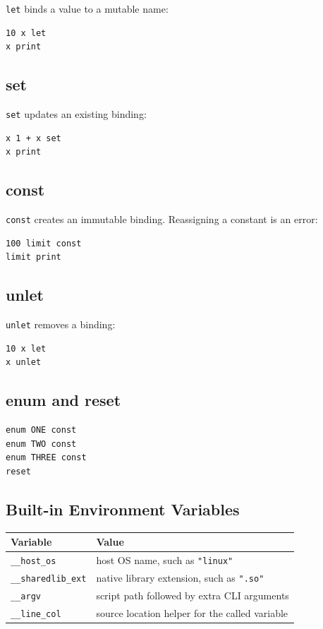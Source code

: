 \documentclass[11pt,a4paper]{article}
\newcommand{\code}[1]{\texttt{#1}}
\begin{document}
\code{let} binds a value to a mutable name:

\begin{lstlisting}[language=Raden]
10 x let
x print
\end{lstlisting}

\subsection{set}

\code{set} updates an existing binding:

\begin{lstlisting}[language=Raden]
x 1 + x set
x print
\end{lstlisting}

\subsection{const}

\code{const} creates an immutable binding. Reassigning a constant is an
error:

\begin{lstlisting}[language=Raden]
100 limit const
limit print
\end{lstlisting}

\subsection{unlet}

\code{unlet} removes a binding:

\begin{lstlisting}[language=Raden]
10 x let
x unlet
\end{lstlisting}

\subsection{enum and reset}

\begin{lstlisting}[language=Raden]
enum ONE const
enum TWO const
enum THREE const
reset
\end{lstlisting}

\subsection{Built-in Environment Variables}

\begin{longtable}{ll}
\toprule
Variable & Value \\
\midrule
\code{\_\_host\_os} & host OS name, such as \code{"linux"} \\
\code{\_\_sharedlib\_ext} & native library extension, such as \code{".so"} \\
\code{\_\_argv} & script path followed by extra CLI arguments \\
\code{\_\_line\_col} & source location helper for the called variable \\
\bottomrule
\end{longtable}
\end{document}

